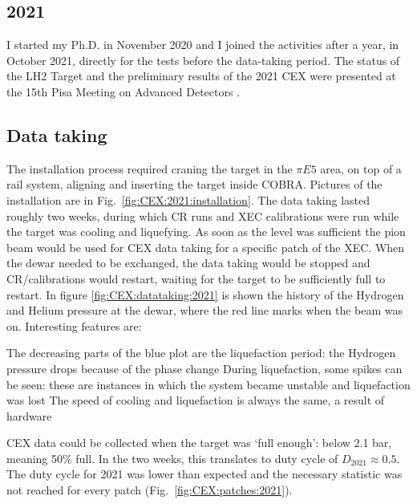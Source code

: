 \begin{refsection}
\section{2021}
    I started my Ph.D. in November 2020 and I joined the activities after a  year, in October 2021, directly for the tests before the data-taking period.
    The status of the LH2 Target and the preliminary results of the 2021 CEX were presented at the 15th Pisa Meeting on Advanced Detectors \cite{Elba:mio}.

    \subsection{Data taking}
        The installation process required craning the target in the $\pi E5$ area, on top of a rail system, aligning and inserting the target inside COBRA.
        Pictures of the installation are in Fig.~\ref{fig:CEX:2021:installation}.
        The data taking lasted roughly two weeks, during which CR runs and XEC calibrations were run while the target was cooling and liquefying. 
        As soon as the level was sufficient the pion beam would be used for CEX data taking for a specific patch of the XEC.  
        When the dewar needed to be exchanged, the data taking would be stopped and CR/calibrations would restart, waiting for the target to be sufficiently full to restart.
        \noindent
        In figure \ref{fig:CEX:datataking:2021} is shown the history of the Hydrogen and Helium pressure at the dewar, where the red line marks when the beam was on. 
        Interesting features are:
        \begin{outline}
            \1 The decreasing parts of the blue plot are the liquefaction period: the Hydrogen pressure drops because of the phase change
            \1 During liquefaction, some spikes can be seen: these are instances in which the system became unstable and liquefaction was lost
            \1 The speed of cooling and liquefaction is always the same, a result of hardware 
        \end{outline}
        CEX data could be collected when the target was `full enough': below 2.1 bar, meaning 50\% full. 
        In the two weeks, this translates to duty cycle of $D_{2021}\approx0.5$.
        The duty cycle for 2021 was lower than expected and the necessary statistic was not reached for every patch (Fig.~\ref{fig:CEX:patches:2021}).


\end{refsection}
